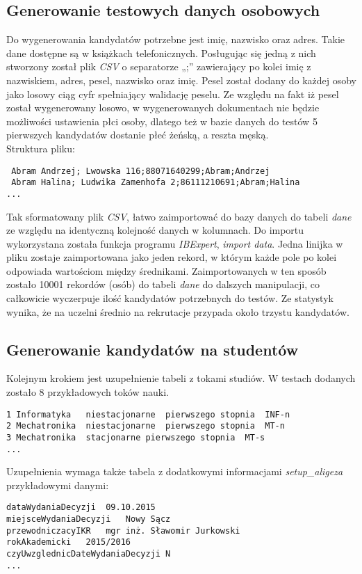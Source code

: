 \subsection{ Generowanie testowych danych osobowych}

Do wygenerowania kandydatów potrzebne jest imię, nazwisko oraz adres. Takie dane dostępne są w książkach telefonicznych. Posługując się jedną z nich stworzony został plik \emph{CSV} o separatorze „;” zawierający po kolei imię z nazwiskiem, adres, pesel, nazwisko oraz imię. Pesel został dodany do każdej osoby jako losowy ciąg cyfr spełniający walidację peselu. Ze względu na fakt iż pesel został wygenerowany losowo,  w wygenerowanych dokumentach nie będzie możliwości ustawienia płci osoby, dlatego też w bazie danych do testów 5 pierwszych kandydatów dostanie płeć żeńską, a reszta męską.\\
Struktura pliku:
\begin{lstlisting}
 Abram Andrzej; Lwowska 116;88071640299;Abram;Andrzej
 Abram Halina; Ludwika Zamenhofa 2;86111210691;Abram;Halina
...

\end{lstlisting}

Tak sformatowany plik \emph{CSV},  łatwo zaimportować do bazy danych do tabeli \emph{dane} ze względu na identyczną kolejność danych w kolumnach. Do importu wykorzystana została funkcja programu \emph{IBExpert}, \emph{import data}. Jedna linijka w pliku zostaje zaimportowana jako jeden rekord, w którym każde pole po kolei odpowiada wartościom między średnikami. Zaimportowanych w ten sposób zostało 10001 rekordów (osób) do tabeli \emph{dane} do dalszych manipulacji, co całkowicie wyczerpuje ilość kandydatów potrzebnych do testów. Ze statystyk wynika, że na uczelni średnio na rekrutacje przypada około trzystu kandydatów.

\subsection{Generowanie kandydatów na studentów}

Kolejnym krokiem jest uzupełnienie tabeli z tokami studiów. W testach dodanych zostało 8 przykładowych toków nauki. 

\begin{lstlisting}
1 Informatyka	niestacjonarne	pierwszego stopnia	INF-n				
2 Mechatronika	niestacjonarne	pierwszego stopnia	MT-n				
3 Mechatronika	stacjonarne	pierwszego stopnia	MT-s				
...
\end{lstlisting}
Uzupełnienia wymaga także tabela z dodatkowymi informacjami \emph{setup\_aligeza} przykładowymi danymi:
\begin{lstlisting}
dataWydaniaDecyzji	09.10.2015
miejsceWydaniaDecyzji	Nowy Sącz
przewodniczacyIKR	mgr inż. Sławomir Jurkowski
rokAkademicki	2015/2016
czyUwzglednicDateWydaniaDecyzji	N
...

\end{lstlisting}

